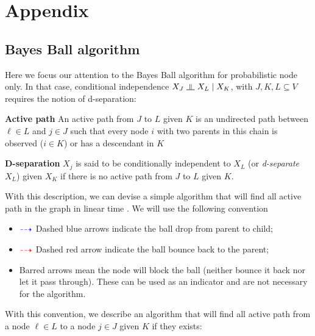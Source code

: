 \documentclass{article}
\numberwithin{equation}{section}
\newcommand{\s}{\hspace{0.1cm}}
\newcommand{\indep}{\s \rotatebox[origin=c]{90}{$\models$}\s }
\theoremstyle{named}
\begin{document}


\section{Appendix}
\subsection{Bayes Ball algorithm}
Here we focus our attention to the Bayes Ball algorithm for probabilistic node only. In that 
case, conditional independence $X_J \indep X_L \mid X_K$, with $J,K,L \subseteq V$ requires 
the notion of d-separation:
\begin{description}
        \item{\textbf{Active path}} An active path from $J$ to $L$ given $K$ is 
                an undirected path between $\ell \in L$ and $j \in J$ such that every 
                node $i$ with two parents in this chain is observed ($i \in K$) or 
                has a descendant in $K$
        \item{\textbf{D-separation}} $X_j$ is said to be conditionally independent to 
                $X_L$ (or 
                \textit{d-separate} $X_L$) given $X_K$ if there is no active path 
                from $J$ to $L$ given $K$.
\end{description}
With this description, we can devise a simple algorithm that will find all active 
path in the graph in linear time \cite{BB}. We will use the following convention 
\begin{itemize}
        \item $\color{blue} \dashrightarrow $ Dashed blue arrows indicate the ball drop from parent to child;
        \item $\color{red} \dashrightarrow$ Dashed red arrow indicate the ball bounce back to the 
                parent;
        \item Barred arrows mean the node will block the ball (neither bounce it back 
                nor let it pass through). These can be used as an indicator and are not 
                necessary for the algorithm.
\end{itemize}
With this convention, we describe an algorithm that will find all active path 
from a node $\ell \in L$ to a node $j \in J$ given 
$K$ if they exists:
\end{document}

